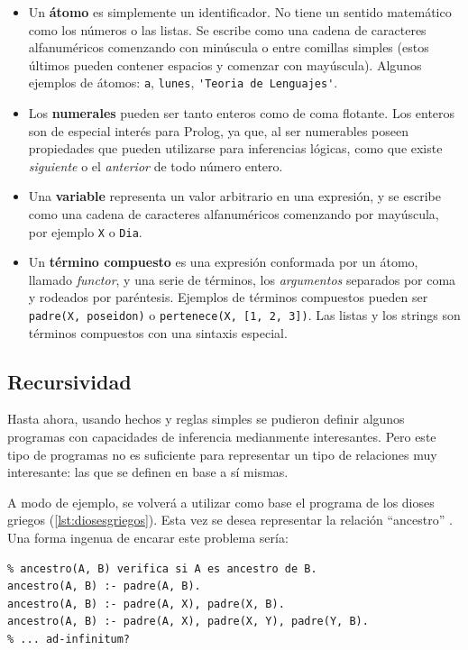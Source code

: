\documentclass[12pt,titlepage]{article}
\begin{document}
\begin{itemize}
    \item Un \textbf{átomo} es simplemente un identificador. No tiene un sentido matemático como los números o las listas. Se escribe como una cadena de caracteres alfanuméricos comenzando con minúscula o entre comillas simples (estos últimos pueden contener espacios y comenzar con mayúscula). Algunos ejemplos de átomos: \lstinline|a|, \lstinline|lunes|, \lstinline|'Teoria de Lenguajes'|.
    \item Los \textbf{numerales} pueden ser tanto enteros como de coma flotante. Los enteros son de especial interés para Prolog, ya que, al ser numerables poseen propiedades que pueden utilizarse para inferencias lógicas, como que existe \emph{siguiente} o el \emph{anterior} de todo número entero.
    \item Una \textbf{variable} representa un valor arbitrario en una expresión, y se escribe como una cadena de caracteres alfanuméricos comenzando por mayúscula, por ejemplo \lstinline|X| o \lstinline|Dia|.
    \item Un \textbf{término compuesto} es una expresión conformada por un átomo, llamado \emph{functor}, y una serie de términos, los \emph{argumentos} separados por coma y rodeados por paréntesis. Ejemplos de términos compuestos pueden ser \lstinline|padre(X, poseidon)| o \lstinline|pertenece(X, [1, 2, 3])|. Las listas y los strings son términos compuestos con una sintaxis especial.
\end{itemize}

\subsection{Recursividad}
\label{sec:recursividad}

Hasta ahora, usando hechos y reglas simples se pudieron definir algunos programas con capacidades de inferencia medianmente interesantes. Pero este tipo de programas no es suficiente para representar un tipo de relaciones muy interesante: las que se definen en base a sí mismas.

A modo de ejemplo, se volverá a utilizar como base el programa de los dioses griegos (\ref{lst:diosesgriegos}). Esta vez se desea representar la relación ``ancestro'' . Una forma ingenua de encarar este problema sería:
\begin{lstlisting}
% ancestro(A, B) verifica si A es ancestro de B.
ancestro(A, B) :- padre(A, B).
ancestro(A, B) :- padre(A, X), padre(X, B).
ancestro(A, B) :- padre(A, X), padre(X, Y), padre(Y, B).
% ... ad-infinitum?
\end{lstlisting}
\end{document}
